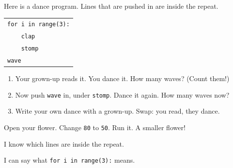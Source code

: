
\begin{playathome}
Here is a dance program. Lines that are pushed in are inside the repeat.
\begin{center}
\begin{tabular}{@{}l@{}}
\texttt{for i in range(3):}\\
\texttt{\ \ \ \ clap}\\
\texttt{\ \ \ \ stomp}\\
\texttt{wave}
\end{tabular}
\end{center}
\begin{enumerate}[leftmargin=1.4em,itemsep=2pt]
  \item Your grown-up reads it. You dance it. How many waves? (Count them!)
  \item Now push \texttt{wave} in, under \texttt{stomp}. Dance it again. How many waves now?
  \item Write your own dance with a grown-up. Swap: you read, they dance.
\end{enumerate}
\end{playathome}

\begin{playathome}
Open your flower. Change \texttt{80} to \texttt{50}. Run it. A smaller flower!
\end{playathome}

\begin{selfcheck}
  \item I know which lines are inside the repeat.
  \item I can say what \texttt{for i in range(3):} means.
\end{selfcheck}
